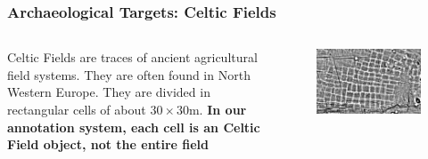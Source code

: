 \documentclass[aspectratio=169]{beamer}
\begin{document}
\begin{frame}
	\frametitle{Archaeological Targets: Celtic Fields}
	\begin{columns}[T] %
		\begin{column}{.48\textwidth}
			Celtic Fields are traces of ancient agricultural field systems. They are often found in North Western Europe. They are divided in rectangular cells of about $30 \times 30$m. \textbf{In our annotation system, each cell is an Celtic Field object, not the entire field}
		\end{column}%
		\hfill%
		\begin{column}{.48\textwidth}

			\begin{figure}
				\centering
				\includegraphics[width=\textwidth]{cfieldsEx}
				\label{}
			\end{figure}
		\end{column}%
	\end{columns}

\end{frame}
\end{document}
